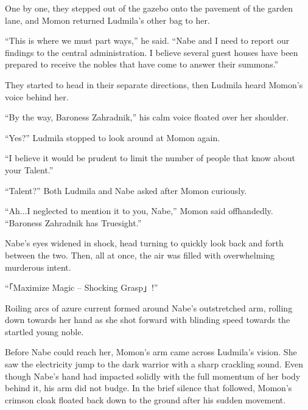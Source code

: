 One by one, they stepped out of the gazebo onto the pavement of the garden lane, and Momon returned Ludmila’s other bag to her.

 

“This is where we must part ways,” he said. “Nabe and I need to report our findings to the central administration. I believe several guest houses have been prepared to receive the nobles that have come to answer their summons.”

 

They started to head in their separate directions, then Ludmila heard Momon’s voice behind her.

 

“By the way, Baroness Zahradnik,” his calm voice floated over her shoulder.

 

“Yes?” Ludmila stopped to look around at Momon again.

 

“I believe it would be prudent to limit the number of people that know about your Talent.”

 

“Talent?” Both Ludmila and Nabe asked after Momon curiously.

 

“Ah...I neglected to mention it to you, Nabe,” Momon said offhandedly. “Baroness Zahradnik has Truesight.”

 

Nabe’s eyes widened in shock, head turning to quickly look back and forth between the two. Then, all at once, the air was filled with overwhelming murderous intent.

 

“「Maximize Magic – Shocking Grasp」!”

 

Roiling arcs of azure current formed around Nabe’s outstretched arm, rolling down towards her hand as she shot forward with blinding speed towards the startled young noble.

 

Before Nabe could reach her, Momon’s arm came across Ludmila's vision. She saw the electricity jump to the dark warrior with a sharp crackling sound. Even though Nabe’s hand had impacted solidly with the full momentum of her body behind it, his arm did not budge. In the brief silence that followed, Momon’s crimson cloak floated back down to the ground after his sudden movement.

 

